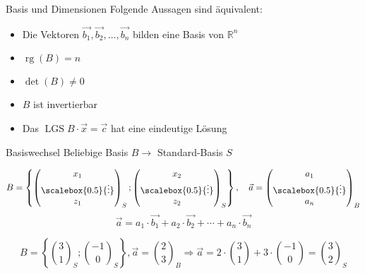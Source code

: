 \begin{theorem}{Basis und Dimensionen}
    Folgende Aussagen sind äquivalent:
    \begin{itemize}
    \item Die Vektoren $\overrightarrow{b_{1}}, \overrightarrow{b_{2}}, \ldots, \overrightarrow{b_{n}}$ bilden eine Basis von $\mathbb{R}^{n}$
    \item $\operatorname{rg}(B)=n$
    \item $\operatorname{det}(B) \neq 0$
    \item $B$ ist invertierbar
    \item Das $\operatorname{LGS} B \cdot \vec{x}=\vec{c}$ hat eine eindeutige Lösung
    \end{itemize}
\end{theorem}

\begin{KR}{Basiswechsel}
    Beliebige Basis $B \rightarrow$ Standard-Basis $S$

    $$
    B = \left\{ \begin{pmatrix} x_{1} \\ \scalebox{0.5}{\vdots} \\ z_{1} \end{pmatrix}_{S} ; \begin{pmatrix} x_{2} \\ \scalebox{0.5}{\vdots} \\ z_{2} \end{pmatrix}_{S} \right\}, \quad \vec{a} = \begin{pmatrix} a_{1} \\ \scalebox{0.5}{\vdots} \\ a_{n} \end{pmatrix}_{B}
    $$
    $$ 
    \vec{a}=a_{1} \cdot \overrightarrow{b_{1}}+a_{2} \cdot \overrightarrow{b_{2}}+\cdots+a_{n} \cdot \overrightarrow{b_{n}}
    $$
\end{KR}

\begin{example}
    $$B=\left\{\binom{3}{1}_{S} ;\binom{-1}{0}_{S}\right\}, \vec{a}=\binom{2}{3}_{B} \Rightarrow \vec{a}=2 \cdot \binom{3}{1}+3 \cdot \binom{-1}{0} = \binom{3}{2}_S$$
\end{example}

